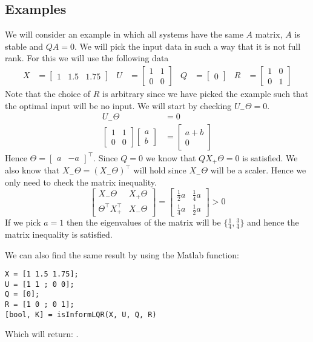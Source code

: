 \subsection{Examples}
We will consider an example in which all systems have the same $A$ matrix, $A$ is stable and $QA = 0$. We will pick the input data in such a way that it is not full rank. For this we will use the following data
\begin{align*}
X &= \begin{bmatrix} 1&1.5&1.75 \end{bmatrix} & 
U &= \begin{bmatrix} 1&1\\0&0 \end{bmatrix} & 
Q &= \begin{bmatrix} 0 \end{bmatrix} &
R &= \begin{bmatrix} 1&0\\0&1 \end{bmatrix}
\end{align*} 
Note that the choice of $R$ is arbitrary since we have picked the example such that the optimal input will be no input. We will start by checking $U_- \Theta = 0$.
\begin{align*}
U_- \Theta &= 0 \\
\begin{bmatrix} 1&1\\0&0 \end{bmatrix}\begin{bmatrix} a\\b \end{bmatrix} &= \begin{bmatrix} a + b\\0 \end{bmatrix}
\end{align*}
Hence $\Theta = \begin{bmatrix} a & -a \end{bmatrix}^\top$. Since $Q = 0$ we know that $QX_+\Theta = 0$ is satisfied. We also know that $X_-\Theta = (X_-\Theta)^\top$ will hold since $X_-\Theta$ will be a scaler. Hence we only need to check the matrix inequality.
\[ \begin{bmatrix} X_-\Theta & X_+\Theta \\ \Theta^\top X_+^\top & X_-\Theta \end{bmatrix} = 
\begin{bmatrix} \frac{1}{2} a & \frac{1}{4} a \\ \frac{1}{4} a & \frac{1}{2} a \end{bmatrix}
 > 0 \]
If we pick $a = 1$ then the eigenvalues of the matrix will be $\{\frac{1}{4}, \frac{3}{4}\}$ and hence the matrix inequality is satisfied.


We can also find the same result by using the Matlab function:
\begin{lstlisting}
X = [1 1.5 1.75];
U = [1 1 ; 0 0];
Q = [0];
R = [1 0 ; 0 1];
[bool, K] = isInformLQR(X, U, Q, R)
\end{lstlisting}
Which will return: \mon{[ 1, [0 ; 0] ]}.
